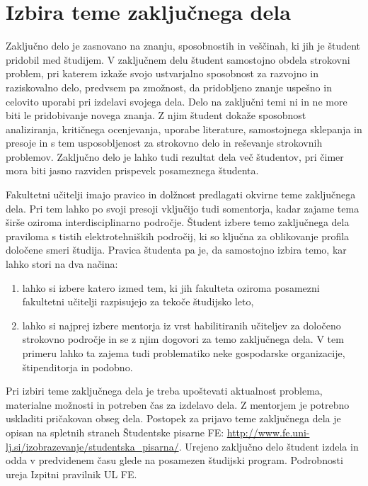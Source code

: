 \documentclass[a4paper,twoside,openright,12pt,slovene]{book}
\begin{document}

\chapter{Izbira teme zaključnega dela} \label{izbira_teme}

Zaključno delo je zasnovano na znanju, sposobnostih in veščinah, ki jih je študent pridobil med študijem. V zaključnem delu študent samostojno obdela strokovni problem, pri katerem izkaže svojo ustvarjalno sposobnost za razvojno in raziskovalno delo, predvsem pa zmožnost, da pridobljeno znanje uspešno in celovito uporabi pri izdelavi svojega dela. Delo na zaključni temi ni in ne more biti le pridobivanje novega znanja. Z njim študent dokaže sposobnost analiziranja, kritičnega ocenjevanja, uporabe literature, samostojnega sklepanja in presoje in s tem usposobljenost za strokovno delo in reševanje strokovnih problemov. Zaključno delo je lahko tudi rezultat dela več študentov, pri čimer mora biti jasno razviden prispevek posameznega študenta.

Fakultetni učitelji imajo pravico in dolžnost predlagati okvirne teme zaključnega dela. Pri tem lahko po svoji presoji vključijo tudi somentorja, kadar zajame tema širše oziroma interdisciplinarno področje. Študent izbere temo zaključnega dela praviloma s tistih elektrotehniških področij, ki so ključna za oblikovanje profila določene smeri študija. Pravica študenta pa je, da samostojno izbira temo, kar lahko stori na dva načina:
\begin{enumerate}[noitemsep]
    \item lahko si izbere katero izmed tem, ki jih fakulteta oziroma posamezni fakultetni učitelji razpisujejo za tekoče študijsko leto,
    \item lahko si najprej izbere mentorja iz vrst habilitiranih učiteljev za določeno strokovno področje in se z njim dogovori za temo zaključnega dela. V tem primeru lahko ta zajema tudi problematiko neke gospodarske organizacije, štipenditorja in podobno.
\end{enumerate}

Pri izbiri teme zaključnega dela je treba upoštevati aktualnost problema, materialne možnosti in potreben čas za izdelavo dela. Z mentorjem je potrebno uskladiti pričakovan obseg dela. Postopek za prijavo teme zaključnega dela je opisan na spletnih straneh Študentske pisarne FE: \url{http://www.fe.uni-lj.si/izobrazevanje/studentska\_pisarna/}. Urejeno zaključno delo študent izdela in odda v predvidenem času glede na posamezen študijski program. Podrobnosti ureja Izpitni pravilnik UL FE.
\end{document}
